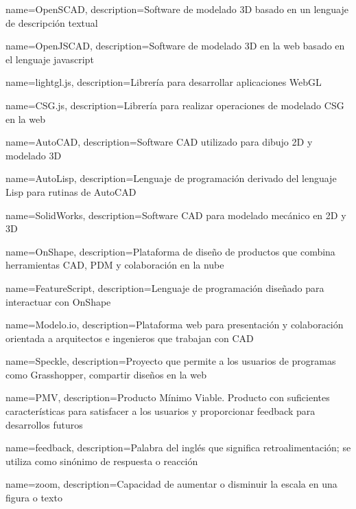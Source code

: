 {
    name=OpenSCAD,
    description={Software de modelado 3D basado en un lenguaje de descripción textual}
}

{
    name=OpenJSCAD,
    description={Software de modelado 3D en la web basado en el lenguaje javascript}
}

{
    name=lightgl.js,
    description={Librería para desarrollar aplicaciones WebGL}
}

{
    name=CSG.js,
    description={Librería para realizar operaciones de modelado CSG en la web}
}

{
    name=AutoCAD,
    description={Software CAD utilizado para dibujo 2D y modelado 3D}
}

{
    name=AutoLisp,
    description={Lenguaje de programación derivado del lenguaje Lisp para rutinas de AutoCAD}
}

{
    name=SolidWorks,
    description={Software CAD para modelado mecánico en 2D y 3D}
}

{
    name=OnShape,
    description={Plataforma de diseño de productos que combina herramientas CAD, PDM y colaboración en la nube}
}

{
    name=FeatureScript,
    description={Lenguaje de programación diseñado para interactuar con OnShape}
}

{
    name=Modelo.io,
    description={Plataforma web para presentación y colaboración orientada a arquitectos e ingenieros que trabajan con CAD}
}

{
    name=Speckle,
    description={Proyecto que permite a los usuarios de programas como Grasshopper, compartir diseños en la web}
}

{
    name=PMV,
    description={Producto Mínimo Viable. Producto con suficientes características para satisfacer a los usuarios y proporcionar feedback para desarrollos futuros}
}

{
    name=feedback,
    description={Palabra del inglés que significa retroalimentación; se utiliza como sinónimo de respuesta o reacción}
}

{
    name=zoom,
    description={Capacidad de aumentar o disminuir la escala en una figura o texto}
}

